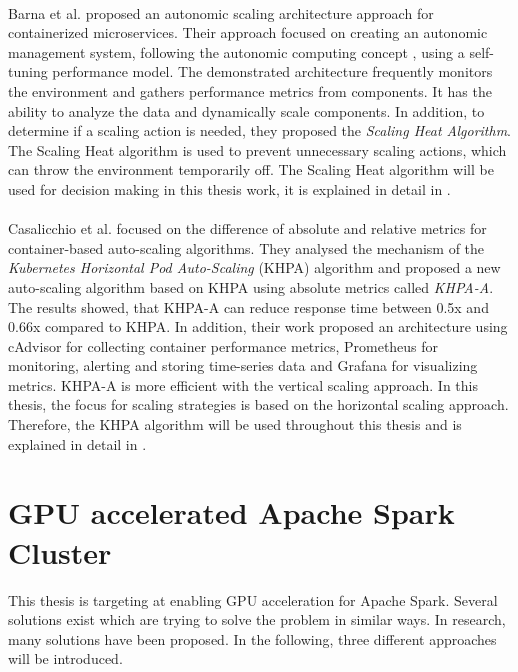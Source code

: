 \paragraph{}Barna et al. \cite{Barna2017ElasticContainerApps} proposed an autonomic scaling architecture approach for containerized microservices. Their approach focused on creating an autonomic management system, following the autonomic computing concept \cite{Kephart2003VisionComputing}, using a self-tuning performance model. The demonstrated architecture frequently monitors the environment and gathers performance metrics from components. It has the ability to analyze the data and dynamically scale components. In addition, to determine if a scaling action is needed, they proposed the \textit{Scaling Heat Algorithm}. The Scaling Heat algorithm is used to prevent unnecessary scaling actions, which can throw the environment temporarily off.
The Scaling Heat algorithm will be used for decision making in this thesis work, it is explained in detail in .


\paragraph{}Casalicchio et al. \cite{Casalicchio2017AutoScaleCont} focused on the difference of absolute and relative metrics for container-based auto-scaling algorithms. They analysed the mechanism of the \textit{Kubernetes Horizontal Pod Auto-Scaling} (KHPA) algorithm and proposed a new auto-scaling algorithm based on KHPA using absolute metrics called \textit{KHPA-A}. The results showed, that KHPA-A can reduce response time between 0.5x and 0.66x compared to KHPA. In addition, their work proposed an architecture using cAdvisor for collecting container performance metrics, Prometheus for monitoring, alerting and storing time-series data and Grafana for visualizing metrics.
KHPA-A is more efficient with the vertical scaling approach. In this thesis, the focus for scaling strategies is based on the horizontal scaling approach. Therefore, the KHPA algorithm will be used throughout this thesis and is explained in detail in .


\section{GPU accelerated Apache Spark Cluster}
This thesis is targeting at enabling GPU acceleration for Apache Spark.
Several solutions exist which are trying to solve the problem in similar ways.
In research, many solutions have been proposed.
In the following, three different approaches will be introduced.


